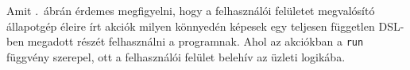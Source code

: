Amit .~ábrán érdemes megfigyelni, hogy a felhasználói felületet megvalósító állapotgép éleire írt akciók milyen könnyedén képesek egy teljesen független \gls{DSL}-ben megadott részét felhasználni a programnak.
Ahol az akciókban a {\tt run} függvény szerepel, ott a felhasználói felület belehív az üzleti logikába.

















